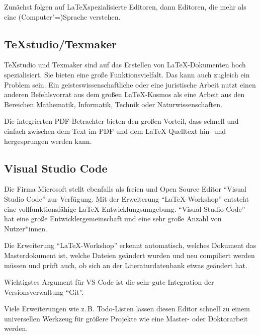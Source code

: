 \documentclass[12pt,	%
				headings=small,		%
				toc=bibliography,	%
			]	%
{scrreprt}		%
\begin{document}
	Zunächst folgen auf \LaTeX spezialisierte Editoren, dann Editoren, die mehr als eine (Computer"=)Sprache verstehen. 

	\subsection{TeXstudio/Texmaker}
	\label{sub:TeXStudioTexMaker}
		TeXstudio\autocite{texstudio} und Texmaker\autocite{texmaker} sind auf das Erstellen von \LaTeX-Dokumenten hoch spezialisiert. Sie bieten eine große Funktionsvielfalt. Das kann auch zugleich ein Problem sein. Ein geisteswissenschaftliche oder eine juristische Arbeit nutzt einen anderen Befehlsvorrat aus dem großen \LaTeX-Kosmos als eine Arbeit aus den Bereichen Mathematik, Informatik, Technik oder Naturwissenschaften. 

		Die integrierten PDF-Betrachter bieten den großen Vorteil, dass schnell und einfach zwischen dem Text im PDF und dem \LaTeX-Quelltext hin- und hergesprungen werden kann.
			

	\subsection{Visual Studio Code}
	\label{sub:VisualStudioCode}
	Die Firma Microsoft stellt ebenfalls als freien und Open Source Editor \enquote{Visual Studio Code} zur Verfügung.\autocite{VSCode} Mit der Erweiterung \enquote{LaTeX-Workshop} entsteht eine vollfunktionsfähige \LaTeX-Entwicklungsumgebung. \enquote{Visual Studio Code} hat eine große Entwicklergemeinschaft und eine sehr große Anzahl von Nutzer*innen. 

	Die Erweiterung \enquote{LaTeX-Workshop} erkennt automatisch, welches Dokument das Masterdokument ist, welche Dateien geändert wurden und neu compiliert werden müssen und prüft auch, ob sich an der Literaturdatenbank etwas geändert hat.\autocite{VSCode:LatexWorkshop}

	Wichtigstes Argument für VS Code ist die sehr gute Integration der Versionsverwaltung \enquote{Git}.

	Viele Erweiterungen wie z.\,B. Todo-Listen lassen diesen Editor schnell zu einem universellen Werkzeug für größere Projekte wie eine Master- oder Doktorarbeit werden.
\end{document}

